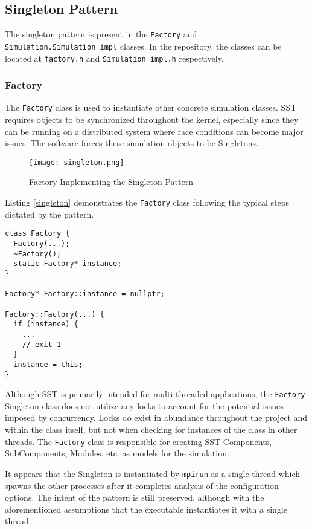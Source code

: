 \subsection{Singleton Pattern}
The singleton pattern is present in the \texttt{Factory} and \texttt{Simulation.Simulation\_impl} classes. In the repository, the classes can be located at \texttt{factory.h} and \texttt{Simulation\_impl.h} respectively.

\subsubsection{Factory}
The \texttt{Factory} class is used to instantiate other concrete simulation classes. SST requires objects to be synchronized throughout the kernel, especially since they can be running on a distributed system where race conditions can become major issues. The software forces these simulation objects to be Singletons.

\begin{figure}[ht]
  \caption{Factory Implementing the Singleton Pattern}
  \centering
  \texttt{[image: singleton.png]}
\end{figure}
\newpage

Listing \ref{singleton} demonstrates the \texttt{Factory} class following the typical steps dictated by the pattern.

\begin{lstlisting}[style=customC++,label=singleton,caption=Factory Implementing the Singleton Pattern \\ Files: src/sst/core/factory.h and src/sst/core/factory.cc]
class Factory {
  Factory(...);
  ~Factory();
  static Factory* instance;
}

Factory* Factory::instance = nullptr;

Factory::Factory(...) {
  if (instance) {
    ...
    // exit 1
  }
  instance = this;
}
\end{lstlisting}

Although SST is primarily intended for multi-threaded applications, the \texttt{Factory} Singleton class does not utilize any locks to account for the potential issues imposed by concurrency. Locks do exist in abundance throughout the project and within the class itself, but not when checking for instances of the class in other threads. The \texttt{Factory} class is responsible for creating SST Components, SubComponents, Modules, etc. as models for the simulation.

It appears that the Singleton is instantiated by \texttt{mpirun} as a single thread which spawns the other processes after it completes analysis of the configuration options. The intent of the pattern is still preserved, although with the aforementioned assumptions that the executable instantiates it with a single thread.
\newpage

